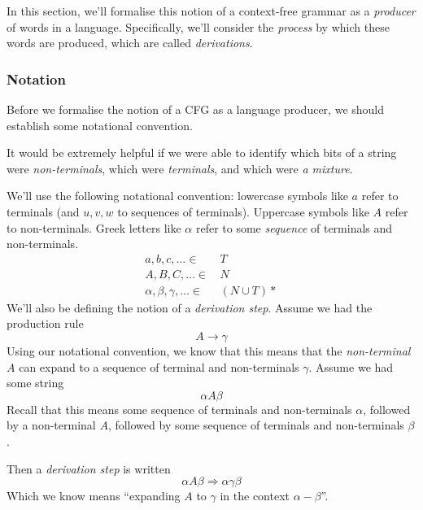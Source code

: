In this section, we'll formalise this notion of a context-free grammar as a \textit{producer} of words in a language. Specifically, we'll consider the \textit{process} by which these words are produced, which are called \textit{derivations}.

\subsubsection{Notation}
Before we formalise the notion of a CFG as a language producer, we should establish some notational convention. 

It would be extremely helpful if we were able to identify which bits of a string were \textit{non-terminals}, which were \textit{terminals}, and which were \textit{a mixture}. 

We'll use the following notational convention: lowercase symbols like $a$ refer to terminals (and $u, v, w$ to sequences of terminals). Uppercase symbols like $A$ refer to non-terminals. Greek letters like $\alpha$ refer to some \textit{sequence} of terminals and non-terminals.
\begin{align*}
    a, b, c, \ldots \in & \, T \\
    A, B, C, \ldots \in & \, N \\
    \alpha, \beta, \gamma, \ldots \in & \, (N \cup T)*
\end{align*}
We'll also be defining the notion of a \textit{derivation step}.  Assume we had the production rule 
\[A \rightarrow \gamma\]
Using our notational convention, we know that this means that the \textit{non-terminal} $A$ can expand to a sequence of terminal and non-terminals $\gamma$. Assume we had some string
\[\alpha A \beta \]
Recall that this means some sequence of terminals and non-terminals $\alpha$, followed by a non-terminal $A$, followed by some sequence of terminals and non-terminals $\beta$. 

Then a \textit{derivation step} is written
\[\alpha A \beta \Rightarrow \alpha \gamma \beta \]
Which we know means ``expanding $A$ to $\gamma$ in the context $\alpha - \beta$''.



